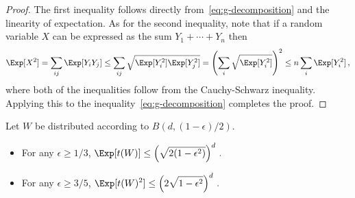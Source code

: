 \begin{proof}
  The first inequality follows directly from~\eqref{eq:g-decomposition} and the linearity of
  expectation. As for the second inequality, note that if a random
  variable $X$ can be expressed as the sum $Y_1 + \cdots + Y_n$ then
  \[
    \Exp[X^2] = \sum_{ij} \Exp[Y_iY_j] \leq \sum_{ij} \sqrt{\Exp[Y_i^2] \Exp[Y_j^2]} = \left(\sum_i \sqrt{\Exp[Y_i^2]} \right)^2 \leq n \sum_i \Exp[Y_i^2]\,,
  \]
  where both of the inequalities follow from the Cauchy-Schwarz inequality.
  Applying this to the inequality~\eqref{eq:g-decomposition} completes the proof.
\end{proof}

\begin{proposition}\label{prop:moments-t-large-eps}
  Let $W$ be distributed according to $B(d,(1 - \epsilon)/2)$.
  \begin{itemize}
  \item For any $\epsilon \geq 1/3$, \quad $\displaystyle \Exp[t(W)] \leq \left(\sqrt{2(1 - \epsilon^2)}\right)^d\,.$
  \item For any $\epsilon \geq 3/5$, \quad $\displaystyle \Exp[t(W)^2] \leq \left(2\sqrt{1 - \epsilon^2}\right)^d\,.$
  \end{itemize}
  \end{proposition}


